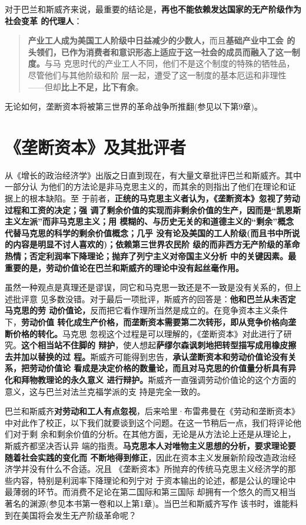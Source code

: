 对于巴兰和斯威齐来说，最重要的结论是，\textbf{再也不能依赖发达国家的无产阶级作为社会变革
的代理人}：

\begin{quotation}
  \textbf{产业工人成为美国工人阶级中日益减少的少数人，}而且\textbf{基础产业中工会
    的头领们，已作为消费者和意识形态上适应于这一社会的成员而融入了这一制度。}与马
  克思时代的产业工人不同，他们不是这个制度的特殊的牺牲品，尽管他们与其他阶级和阶
  层一起，遭受了这一制度的基本厄运和非理性——但却\textbf{比上不足，比下有余}。
\end{quotation}

无论如何，垄断资本将被第三世界的革命战争所推翻(参见以下第9章)。

\section{《垄断资本》及其批评者}
从《增长的政治经济学》出版之日直到现在，有大量文章批评巴兰和斯威齐。其中一部分认
为他们的方法论是非马克思主义的，而其余的则指出了他们在理论和证据上的根本缺陷。至
于前者，\textbf{正统的马克思主义者认为，《垄断资本》忽视了劳动过程和工资的决定；强
  调了剩余价值的实现而非剩余价值的生产，因而是“凯恩斯主义左派”而非马克思主义；用
  模糊的、与历史无关的和道德主义的“剩余”概念代替马克思的科学的剩余价值概念；几乎
  没有论及美国的工人阶级(而且书中所说的内容是明显不讨人喜欢的)；依赖第三世界农民阶
  级的而非西方无产阶级的革命热情；否定利润率下降理论；抛弃了列宁主义对帝国主义分析
  中的关键因素。最重要的是，劳动价值论在巴兰和斯威齐的理论中没有起丝毫作用。}

虽然一种观点是真理还是谬误，同它和马克思一致还是不一致是没有关系的，但上述批评意
见多数没错。对于最后一项批评，斯威齐的回答是：\textbf{他和巴兰从未否定马克思的劳
  动价值论，}反而把它看作理所当然是成立的。在竞争资本主义条件下，\textbf{劳动价值
  转化成生产价格，而垄断资本需要第二次转形，即从竞争价格向垄断价格的转化。}马克思
忽视这个过程是可以理解的，《垄断资本》对此进行了研究。\textbf{这个相当站不住脚的
  辩护}，使人想起\textbf{萨缪尔森讽刺地把转型描写成用橡皮擦去并加以替换的过
  程。}斯威齐可能得到忠告，\textbf{承认垄断资本和劳动价值论没有关系，把劳动价值论
  看成是决定价格的数量论，而且对马克思的价值量分析具有异化和拜物教理论的永久意义
  进行辩护。}斯威齐一直强调劳动价值论的这个方面的意义，这与巴兰对法兰克福学派的支
持是完全一致的。

巴兰和斯威齐\textbf{对劳动和工人有点忽视}，后来哈里·布雷弗曼在《劳动和垄断资本》
中对此作了校正，以下我们就要谈到这个问题。在这一节稍后一点，我们将评论他们对于剩
余和剩余价值的分析。在其他方面，无论是从方法论上还是从理论上，斯威齐都坚决否认异
端的指责。\textbf{马克思本人对唯物主义思想的分析，要求理论要随着社会实践的变化而
  不断地得到修正}，因此在资本主义发展新阶段改造政治经济学并没有什么不合适。况且
《垄断资本》所抛弃的传统马克思主义经济学的那些内容，特别是利润率下降理论和列宁对
于资本输出的论述，都是公认的理论中最薄弱的环节。而消费不足论在第二国际和第三国际
却拥有一个悠久的而又相当著名的渊源(参见本书第一卷和以上第1章)。当巴兰和斯威齐写作
该书时，谁能料到在美国将会发生无产阶级革命呢？

